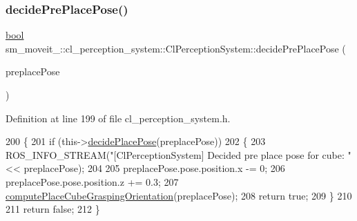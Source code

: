 \mbox{\label{classsm__moveit__4_1_1cl__perception__system_1_1ClPerceptionSystem_a027d06bc7cba5ace251a65bb29777c26}} 
\subsubsection{\texorpdfstring{decide\+Pre\+Place\+Pose()}{decidePrePlacePose()}}
{\footnotesize\ttfamily \hyperlink{classbool}{bool} sm\+\_\+moveit\+\_\+::cl\+\_\+perception\+\_\+system\+::\+Cl\+Perception\+System\+::decide\+Pre\+Place\+Pose (\begin{DoxyParamCaption}\item[{geometry\+\_\+msgs\+::\+Pose\+Stamped \&}]{preplace\+Pose }\end{DoxyParamCaption})\hspace{0.3cm}{\ttfamily [inline]}}



Definition at line 199 of file cl\+\_\+perception\+\_\+system.\+h.


\begin{DoxyCode}
200             \{
201                 \textcolor{keywordflow}{if} (this->\hyperlink{classsm__moveit__4_1_1cl__perception__system_1_1ClPerceptionSystem_af6ff9a225d451bdee312573296ed02a8}{decidePlacePose}(preplacePose))
202                 \{
203                     ROS\_INFO\_STREAM(\textcolor{stringliteral}{"[ClPerceptionSystem] Decided pre place pose for cube: "} << 
      preplacePose);
204 
205                     preplacePose.pose.position.x -= 0;
206                     preplacePose.pose.position.z += 0.3;
207                     \hyperlink{classsm__moveit__4_1_1cl__perception__system_1_1ClPerceptionSystem_afda35b6252c0a5c0692e3ff956609c23}{computePlaceCubeGraspingOrientation}(preplacePose);
208                     \textcolor{keywordflow}{return} \textcolor{keyword}{true};
209                 \}
210 
211                 \textcolor{keywordflow}{return} \textcolor{keyword}{false};
212             \}
\end{DoxyCode}
\mbox{\label{classsm__moveit__4_1_1cl__perception__system_1_1ClPerceptionSystem_a234d70a76bb5bf73f23d420c2b541632}} 
